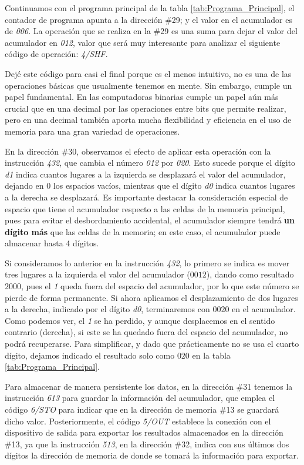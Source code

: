 \documentclass[letterpaper,12pt,oneside]{book}
\begin{document}
	
	Continuamos con el programa principal de la tabla \ref{tab:Programa_Principal}, el contador de programa apunta a
	la dirección \#29; y el
	valor en el acumulador es de \textit{006}. La operación que se
 realiza en la \#29 es una suma para dejar
 el valor del acumulador en \textit{012}, valor que será muy
	interesante para analizar el siguiente código de operación: \textit{4/SHF}.
 
    Dejé este código para  casi el final
	porque
	es el menos intuitivo, no es una de las operaciones básicas que usualmente tenemos en mente. Sin embargo, cumple un papel fundamental. En las 
	computadoras binarias cumple un papel aún más crucial que en una decimal por las operaciones entre bits que permite realizar, pero en una decimal
	también aporta mucha flexibilidad y eficiencia en el uso de memoria para una gran variedad de operaciones.
	
	En la dirección \#30, observamos el efecto de aplicar esta operación con la instrucción \textit{432}, que cambia el número \textit{012} por
	\textit{020}. Esto sucede porque el dígito \textit{d1} indica cuantos lugares a la izquierda se desplazará el valor
	del acumulador, dejando en 0 los espacios vacíos, mientras que el dígito \textit{d0} indica cuantos lugares a la derecha se desplazará.
	Es importante destacar la consideración especial de espacio que tiene el acumulador respecto a las celdas de la memoria principal, pues
	para evitar el desbordamiento accidental, el acumulador siempre tendrá \textbf{un dígito más} que las celdas de la memoria;
	en este caso, el acumulador puede almacenar hasta 4 dígitos.
	
	Si consideramos lo anterior en la instrucción \textit{432}, lo  primero se indica es mover tres lugares a la izquierda
	el valor del acumulador ($0012$), dando como resultado $2000$, pues el \textit{1} queda fuera
	del espacio del acumulador, por lo que este número se pierde de forma permanente. Si ahora aplicamos el desplazamiento de dos lugares 	
	a la derecha, indicado por el dígito \textit{d0}, terminaremos con $0020$ en el acumulador. Como podemos ver, el \textit{1} se ha perdido, y aunque desplacemos
	en el sentido contrario (derecha), si este se ha quedado fuera del espacio del acumulador, no podrá recuperarse. Para simplificar, y dado que prácticamente no se usa el cuarto dígito, dejamos indicado el resultado solo como $020$ en la tabla \ref{tab:Programa_Principal}.
	
	
	Para almacenar de manera persistente los datos, en la dirección \#31 tenemos la instrucción \textit{613} para guardar la información del acumulador, que
	emplea el código \textit{6/STO} para indicar que en la dirección de memoria
	\#13 se guardará dicho valor. Posteriormente, el código  \textit{5/OUT} establece la conexión con el dispositivo de salida para exportar los resultados
	almacenados en la dirección \#13, ya que la instrucción \textit{513}, en la dirección \#32, indica con sus últimos dos dígitos la dirección
	de memoria de donde se tomará la información para exportar.
 
\end{document}
